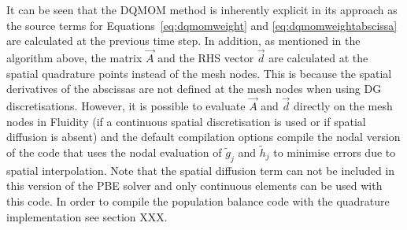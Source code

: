 It can be seen that the DQMOM method is inherently explicit in its approach as the source terms for Equations~\eqref{eq:dqmomweight} and \eqref{eq:dqmomweightabscissa} are calculated at the previous time step. 
In addition, as mentioned in the algorithm above, the matrix $\vec{A}$ and the RHS vector $\vec{d}$ are calculated at the spatial quadrature points instead of the mesh nodes. This is because the spatial derivatives of the abscissas are not defined at the mesh nodes when using DG discretisations.
However, it is possible to evaluate $\vec{A}$ and $\vec{d}$ directly on the mesh nodes in Fluidity (if a continuous spatial discretisation is used or if spatial diffusion is absent) and the default compilation options compile the nodal version of the code that uses the nodal evaluation of $\widetilde{g}_j$ and $\widetilde{h}_j$ to minimise errors due to spatial interpolation.
Note that the spatial diffusion term can not be included in this version of the PBE solver and only continuous elements can be used with this code. In order to compile the population balance code with the quadrature implementation see section XXX.
